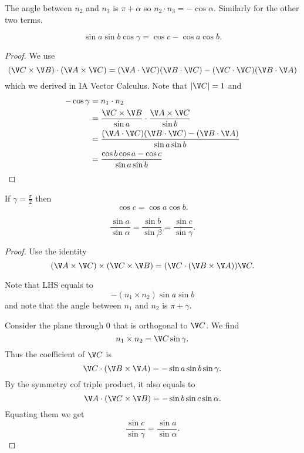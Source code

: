 \documentclass[a4paper]{article}
\theoremstyle{definition}
\begin{document}
\begin{note}
  The angle between \(n_2\) and \(n_3\) is \(\pi + \alpha\) so \(n_2 \cdot n_3 = -\cos \alpha\). Similarly for the other two terms.
\end{note}

\begin{theorem}
  \[
    \sin a \sin b \cos \gamma = \cos c - \cos a \cos b.
  \]
\end{theorem}

\begin{proof}
  We use
  \[
    (\V C \times \V B) \cdot (\V A \times \V C) = (\V A \cdot \V C)(\V B \cdot \V C) - (\V C \cdot \V C)(\V B \cdot \V A)
  \]
  which we derived in IA Vector Calculus. Note that \(|\V C| = 1\) and
  \begin{align*}
    -\cos \gamma &= n_1 \cdot n_2 \\
                 &= \frac{\V C \times \V B}{\sin a} \cdot \frac{\V A \times \V C}{\sin b} \\
                 &= \frac{(\V A \cdot \V C)(\V B \cdot \V C) - (\V B \cdot \V A)}{\sin a \sin b} \\
                 &= \frac{\cos b \cos a - \cos c}{\sin a \sin b}
  \end{align*}
\end{proof}

\begin{corollary}
  If \(\gamma = \frac{\pi}{2}\) then
  \[
    \cos c = \cos a \cos b.
  \]
\end{corollary}

\begin{theorem}
  \[
    \frac{\sin a}{\sin \alpha} = \frac{\sin b}{\sin \beta} = \frac{\sin c}{\sin \gamma}.
  \]
\end{theorem}

\begin{proof}
  Use the identity
  \[
    (\V A \times \V C) \times (\V C \times \V B) = (\V C \cdot (\V B \times \V A)) \V C.
  \]

  Note that LHS equals to
  \[
    -(n_1 \times n_2) \sin a \sin b
  \]
  and note that the angle between \(n_1\) and \(n_2\) is \(\pi + \gamma\).

  Consider the plane through \(0\) that is orthogonal to \(\V C\). We find
  \[
    n_1 \times n_2 = \V C \sin \gamma.
  \]
  Thus the coefficient of \(\V C\) is
  \[
    \V C \cdot (\V B \times \V A) = -\sin a \sin b \sin \gamma.
  \]
  By the symmetry cof triple product, it also equals to
  \[
    \V A \cdot (\V C \times \V B) = -\sin b \sin c \sin \alpha.
  \]
  Equating them we get
  \[
    \frac{\sin c}{\sin \gamma} = \frac{\sin a}{\sin \alpha}.
  \]
\end{proof}
\end{document}
